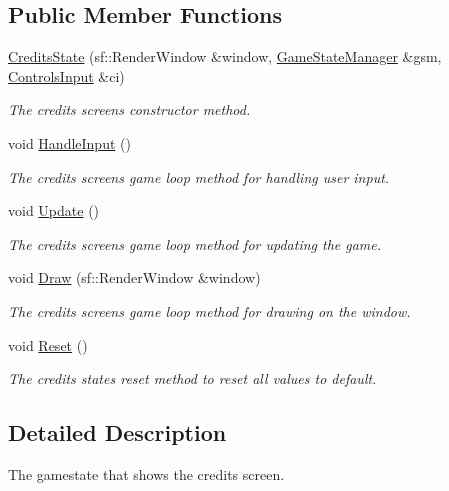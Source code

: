 \subsection*{Public Member Functions}
\begin{DoxyCompactItemize}
\item 
\hyperlink{class_credits_state_a95163ef799a4afe3688d88e7cc8ae3b3}{Credits\+State} (sf\+::\+Render\+Window \&window, \hyperlink{class_game_state_manager}{Game\+State\+Manager} \&gsm, \hyperlink{struct_controls_input}{Controls\+Input} \&ci)
\begin{DoxyCompactList}\small\item\em The credits screen\textquotesingle{}s constructor method. \end{DoxyCompactList}\item 
void \hyperlink{class_credits_state_a63557b2290a2febb88e78ae90754a7ec}{Handle\+Input} ()
\begin{DoxyCompactList}\small\item\em The credits screen\textquotesingle{}s game loop method for handling user input. \end{DoxyCompactList}\item 
void \hyperlink{class_credits_state_a565adc4ac454f23941c5db684da56ad7}{Update} ()
\begin{DoxyCompactList}\small\item\em The credits screen\textquotesingle{}s game loop method for updating the game. \end{DoxyCompactList}\item 
void \hyperlink{class_credits_state_a085e7decf7f1fc7edae68db50851b84a}{Draw} (sf\+::\+Render\+Window \&window)
\begin{DoxyCompactList}\small\item\em The credits screen\textquotesingle{}s game loop method for drawing on the window. \end{DoxyCompactList}\item 
void \hyperlink{class_credits_state_ad87636e8b9438092bd0151185f385c17}{Reset} ()
\begin{DoxyCompactList}\small\item\em The credits state\textquotesingle{}s reset method to reset all values to default. \end{DoxyCompactList}\end{DoxyCompactItemize}


\subsection{Detailed Description}
The gamestate that shows the credits screen. 

